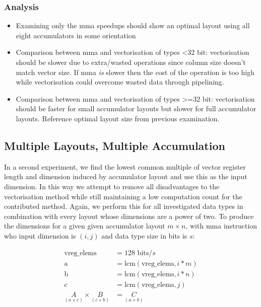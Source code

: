 \documentclass[\main/thesis.tex]{subfiles}
\begin{document}
\subsubsection{Analysis}
\label{sec:mlsaAnalysis}
\begin{itemize}
  \item Examining only the mma speedups should show an optimal layout using all eight accumulators in some orientation
  \item
    Comparison between mma and vectorisation of types <32 bit: vectorisation should be slower due to extra/wasted operations since column size doesn't match vector size.
    If mma \emph{is} slower then the cost of the operation is too high while vectorisation could overcome wasted data through pipelining.
  \item
    Comparison between mma and vectorisation of types >=32 bit: vectorisation should be faster for small accumulator layouts but slower for full accumulator layouts.
    Reference optimal layout size from previous examination.
\end{itemize}

\subsection{Multiple Layouts, Multiple Accumulation}
\label{sec:mlma}
In a second experiment, we find the lowest common multiple of vector register length and dimension induced by accumulator layout and use this as the input dimension.
In this way we attempt to remove all disadvantages to the \gls{vectorisation} method while still maintaining a low computation count for the contributed method.
Again, we perform this for all investigated data types in combination with every layout whose dimensions are a power of two.
To produce the dimensions for a given given accumulator layout $m \times n$, with \gls{mma} instruction who input dimension is $(i, j)$ and data type size in bits is $s$:

\begin{equation}
  \begin{split}
    \text{vreg\_elems} &= 128\text{ bits} / s\\
    \text{a} &= \text{lcm}(\text{vreg\_elems}, i * m)\\
    \text{b} &= \text{lcm}(\text{vreg\_elems}, i * n)\\
    \text{c} &= \text{lcm}(\text{vreg\_elems}, j)\\
    \underset{(a \times c)}{A} \times \underset{(c \times b)}{B} &= \underset{(a \times b)}{C}\\
  \end{split}
\end{equation}
\end{document}

